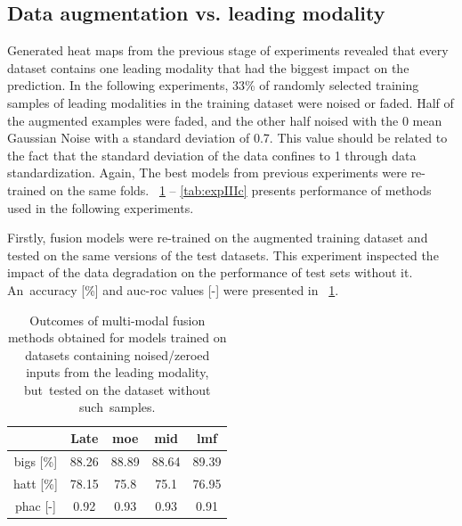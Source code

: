 \documentclass[a4paper, 10pt, twoside]{report}
\begin{document}
\subsection{Data augmentation vs. leading modality}
\label{part:experiments:fusion:multi:leadingmodality}

Generated heat maps from the previous stage of experiments revealed that every dataset contains one leading modality that had the biggest impact on the prediction. In the following experiments, 33\% of randomly selected training samples of leading modalities in the training dataset were noised or faded. Half of the augmented examples were faded, and the other half noised with the 0 mean Gaussian Noise with a standard deviation of 0.7. This value should be related to the fact that the standard deviation of the data confines to 1 through data standardization. Again, The best models from previous experiments were re-trained on the same folds. \Table~\ref{tab:expIIIa} -- \ref{tab:expIIIc} presents performance of methods used in the following experiments.

Firstly, fusion models were re-trained on the augmented training dataset and tested on the same versions of the test datasets. This experiment inspected the impact of the data degradation on the performance of test sets without it. An~accuracy [\%] and \acrshort{auc}-\acrshort{roc} values [-] were presented in \Table~\ref{tab:expIIIa}. 


\begin{table}[H]
\centering

\caption{Outcomes of multi-modal fusion methods obtained for models trained on datasets containing noised/zeroed inputs from the leading modality, but~tested on the dataset without such~samples.}

\begin{tabular}{ccccc}
\toprule
\textbf{}                                    & \textbf{Late} & \textbf{\acrshort{moe}} & \textbf{\acrshort{mid}} & \textbf{\acrshort{lmf}} \\ \midrule
\multicolumn{1}{c}{\acrshort{bigs} {[}\%{]}} & 88.26         & 88.89              & 88.64        & 89.39        \\ \midrule
\multicolumn{1}{c}{\acrshort{hatt} {[}\%{]}} & 78.15         & 75.8               & 75.1         & 76.95        \\ \midrule
\multicolumn{1}{c}{\acrshort{phac}  {[}-{]}} & 0.92          & 0.93               & 0.93         & 0.91         \\ \bottomrule
\end{tabular}
\label{tab:expIIIa}
\end{table}
\end{document}
